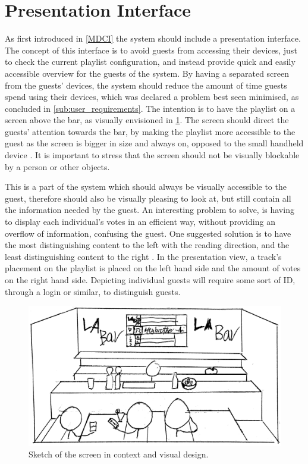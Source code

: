 \section{Presentation Interface}
As first introduced in \cref{MDCI} the system should include a presentation interface. The concept of this interface is to avoid guests from accessing their devices, just to check the current playlist configuration, and instead provide quick and easily accessible overview for the guests of the system. By having a separated screen from the guests' devices, the system should reduce the amount of time guests spend using their devices, which was declared a problem best seen minimised, as concluded in \cref{sub:user_requirements}. The intention is to have the playlist on a screen above the bar, as visually envisioned in \cref{fig:PresentationInterface}. The screen should direct the guests' attention towards the bar, by making the playlist more accessible to the guest as the screen is bigger in size and always on, opposed to the small handheld device \cite{DEB}. It is important to stress that the screen should not be visually blockable by a person or other objects.

This is a part of the system which should always be visually accessible to the guest, therefore should also be visually pleasing to look at, but still contain all the information needed by the guest. An interesting problem to solve, is having to display each individual's votes in an efficient way, without providing an overflow of information, confusing the guest. One suggested solution is to have the most distinguishing content to the left with the reading direction, and the least distinguishing content to the right \cite{material}. In the presentation view, a track's placement on the playlist is placed on the left hand side and the amount of votes on the right hand side. Depicting individual guests will require some sort of ID, through a login or similar, to distinguish guests.

\begin{figure}[hbtp]
  \centering
  \includegraphics[width=1.0\linewidth]{Images/presentation.png}
  \caption{Sketch of the screen in context and visual design.}\label{fig:PresentationInterface}
\end{figure}

